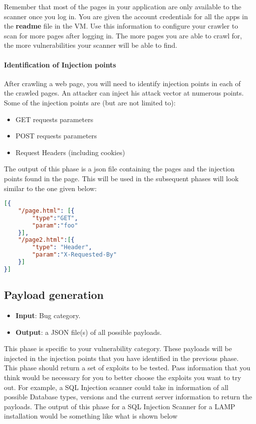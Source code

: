 \documentclass{article}[10pt]
\begin{document}
Remember that most of the pages in your application are only available to the scanner once you log in. You are given the account credentials for all the apps in the {\bf readme} file in the VM. Use this information to configure your crawler to scan for more pages after logging in. The more pages you are able to crawl for, the more vulnerabilities your scanner will be able to find.

\paragraph{Identification of Injection points}
After crawling a web page, you will need to identify injection points in each of the crawled pages. An attacker can inject his attack vector at numerous points. Some of the injection points are (but are not limited to):
	\begin{itemize}
	\item GET requests parameters
	\item POST requests parameters
	\item Request Headers (including cookies)
	\end{itemize}

The output of this phase is a json file containing the pages and the injection points found in the page.
This will be used in the subsequent phases will look similar to the one given below:
\begin{lstlisting}[language=json,firstnumber=1]
[{
	"/page.html": [{
		"type":"GET",
		"param":"foo"
	}],
	"/page2.html":[{
		"type": "Header",
		"param":"X-Requested-By"
	}]
}]
\end{lstlisting}

\subsection{Payload generation}
\begin{itemize}
	\item \textbf{Input}: Bug category.
	\item \textbf{Output}: a JSON file(s) of all possible payloads.
\end{itemize}
This phase is specific to your vulnerability category. These payloads will be injected in the injection points that you have identified in the previous phase. 
This phase should return a set of exploits to be tested. Pass information that you think would be necessary for you to better choose the exploits you want to try out. For example, a SQL Injection scanner could take in information of all possible Database types, versions and the current server information to return the payloads. The output of this phase for a SQL Injection Scanner for a LAMP installation would be something like what is shown below
\end{document}
